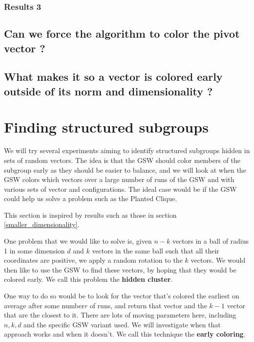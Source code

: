 \documentclass[12pt]{article}
\begin{document}
\subsubsection{Results 3}

\subsection{Can we force the algorithm to color the pivot vector ?}
\subsection{What makes it so a vector is colored early outside of its norm and dimensionality ?}
\section{Finding structured subgroups}
We will try several experiments aiming to identify structured subgroups hidden in sets of random vectors. The idea is that the GSW should color members of the subgroup early as they should be easier to balance, and we will look at when the GSW colors which vectors over a large number of runs of the GSW and with various sets of vector and configurations. The ideal case would be if the GSW could help us solve a problem such as the Planted Clique.

This section is inspired by results such as those in section \ref{smaller_dimensionality}.

One problem that we would like to solve is, given $n-k$ vectors in a ball of radius 1 in some dimension $d$ and $k$ vectors in the same ball such that all their coordinates are positive, we apply a random rotation to the $k$ vectors. We would then like to use the GSW to find these vectors, by hoping that they would be colored early. We call this problem the \textbf{hidden cluster}.

One way to do so would be to look for the vector that's colored the earliest on average after some number$r$ of runs, and return that vector and the $k-1$ vector that are the closest to it. There are lots of moving parameters here, including $n,k,d$ and the specific GSW variant used. We will investigate when that approach works and when it doesn't. We call this technique the \textbf{early coloring}.
\end{document}
